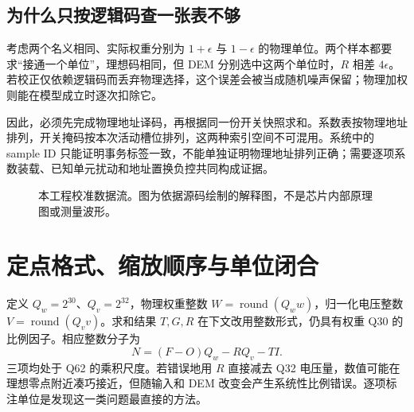 \subsection{为什么只按逻辑码查一张表不够}
考虑两个名义相同、实际权重分别为 \(1+\epsilon\) 与 \(1-\epsilon\) 的物理单位。两个样本都要求“接通一个单位”，理想码相同，但 DEM 分别选中这两个单位时，\(R\) 相差 \(4\epsilon\)。若校正仅依赖逻辑码而丢弃物理选择，这个误差会被当成随机噪声保留；物理加权则能在模型成立时逐次扣除它。

因此，必须先完成物理地址译码，再根据同一份开关快照求和。系数表按物理地址排列，开关掩码按本次活动槽位排列，这两种索引空间不可混用。系统中的 sample ID 只能证明事务标签一致，不能单独证明物理地址排列正确；需要逐项系数装载、已知单元扰动和地址置换负控共同构成证据。

\begin{figure}[htbp]\centering
{}
\caption{本工程校准数据流。图为依据源码绘制的解释图，不是芯片内部原理图或测量波形。}
\end{figure}

\section{定点格式、缩放顺序与单位闭合}
定义 \(Q_w=2^{30}\)、\(Q_v=2^{32}\)，物理权重整数 \(W=\operatorname{round}(Q_ww)\)，归一化电压整数 \(V=\operatorname{round}(Q_vv)\)。求和结果 \(T,G,R\) 在下文改用整数形式，仍具有权重 Q30 的比例因子。相应整数分子为
\begin{equation}
N=(F-O)Q_w-RQ_v-TI.
\end{equation}
三项均处于 Q62 的乘积尺度。若错误地用 \(R\) 直接减去 Q32 电压量，数值可能在理想零点附近凑巧接近，但随输入和 DEM 改变会产生系统性比例错误。逐项标注单位是发现这一类问题最直接的方法。

